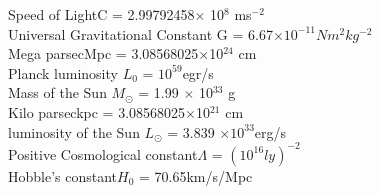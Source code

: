 Speed of Light\hspace{5.01cm}C = 2.99792458$\times$ 10$^8$ ms$^{-2}$\\
Universal Gravitational Constant\hspace{1.11cm} G = 6.67$\times 10^{-11}Nm^{2}kg^{-2}$\\
Mega parsec\hspace{5.5cm}Mpc = 3.08568025$\times$10$^{24}$ cm\\
Planck luminosity\hspace{4.15cm} $L_{0}$ = $10^{59}$egr/s\\
Mass of the Sun\hspace{4.51cm} $M_{\odot}$ = 1.99 $\times$ 10$^{33}$ g\\
Kilo parsec\hspace{5.75cm}kpc = 3.08568025$\times$10$^{21}$ cm\\
luminosity of the Sun\hspace{3.45cm} $L_{\odot}$ = 3.839 $\times 10^{33}$erg/s\\
Positive Cosmological constant\hspace{1.65cm}$\Lambda$ = $(10^{16}ly)^{-2}$\\
Hobble's constant\hspace{4.2cm}$H_{0}$ = 70.65km/s/Mpc